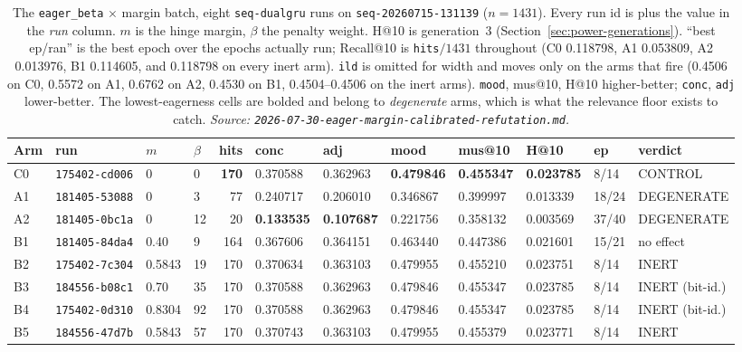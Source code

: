 \documentclass[11pt]{article}
\newcommand{\runid}[1]{\texttt{\small\seqsplit{#1}}}
\newcommand{\dsid}[1]{\texttt{\small #1}}
\newcommand{\best}[1]{\textbf{#1}}
\begin{document}
\begin{table}[ht]
  \centering
  \caption{The \texttt{eager\_beta} $\times$ margin batch, eight
  \texttt{seq-dualgru} runs on \dsid{seq-20260715-131139} ($n=\num{1431}$). Every
  run id is \protect\runid{run-20260730-} plus the value in the \emph{run} column.
  $m$ is the hinge margin, $\beta$ the penalty weight. H@10 is generation~3
  (Section~\ref{sec:power-generations}). ``best ep/ran'' is the best epoch over
  the epochs actually run; Recall@10 is \texttt{hits}$/\num{1431}$ throughout
  (C0 \num{0.118798}, A1 \num{0.053809}, A2 \num{0.013976}, B1 \num{0.114605}, and
  \num{0.118798} on every inert arm). \texttt{ild} is omitted for width and moves
  only on the arms that fire (\num{0.4506} on C0, \num{0.5572} on A1, \num{0.6762}
  on A2, \num{0.4530} on B1, \numrange{0.4504}{0.4506} on the inert arms).
  \texttt{mood}, mus@10, H@10 higher-better; \texttt{conc}, \texttt{adj}
  lower-better. The lowest-eagerness
  cells are bolded and belong to \emph{degenerate} arms, which is what the
  relevance floor exists to catch.
  \emph{Source: \texttt{2026-07-30-eager-margin-calibrated-refutation.md}.}}
  \label{tab:eagermargin}
  {\scriptsize\setlength{\tabcolsep}{2.8pt}\begin{tabular}{llllrlllllll}
    \toprule
    Arm & run & $m$ & $\beta$ & hits & conc & adj & mood & mus@10 & H@10 & ep & verdict \\
    \midrule
    C0 & \texttt{175402-cd006} & 0 & 0 & \best{170} & 0.370588 & 0.362963 & \best{0.479846} & \best{0.455347} & \best{0.023785} & 8/14 & CONTROL \\
    A1 & \texttt{181405-53088} & 0 & 3 & 77 & 0.240717 & 0.206010 & 0.346867 & 0.399997 & 0.013339 & 18/24 & DEGENERATE \\
    A2 & \texttt{181405-0bc1a} & 0 & 12 & 20 & \best{0.133535} & \best{0.107687} & 0.221756 & 0.358132 & 0.003569 & 37/40 & DEGENERATE \\
    B1 & \texttt{181405-84da4} & 0.40 & 9 & 164 & 0.367606 & 0.364151 & 0.463440 & 0.447386 & 0.021601 & 15/21 & no effect \\
    B2 & \texttt{175402-7c304} & 0.5843 & 19 & 170 & 0.370634 & 0.363103 & 0.479955 & 0.455210 & 0.023751 & 8/14 & INERT \\
    B3 & \texttt{184556-b08c1} & 0.70 & 35 & 170 & 0.370588 & 0.362963 & 0.479846 & 0.455347 & 0.023785 & 8/14 & INERT (bit-id.) \\
    B4 & \texttt{175402-0d310} & 0.8304 & 92 & 170 & 0.370588 & 0.362963 & 0.479846 & 0.455347 & 0.023785 & 8/14 & INERT (bit-id.) \\
    B5 & \texttt{184556-47d7b} & 0.5843 & 57 & 170 & 0.370743 & 0.363103 & 0.479955 & 0.455379 & 0.023771 & 8/14 & INERT \\
    \bottomrule
  \end{tabular}}
\end{table}
\end{document}
